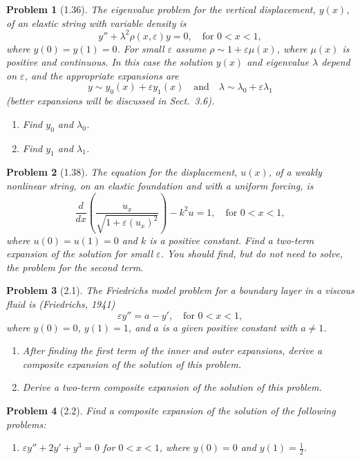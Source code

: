 \documentclass[11pt]{article}
\theoremstyle{problemstyle}
\newtheorem{problem}{Problem}
\begin{document}
\begin{problem}[1.36]
The eigenvalue problem for the vertical displacement, $y(x)$, of an elastic
string with variable density is
\[
y'' + \lambda^2 \rho(x, \varepsilon) y = 0, \quad \text{for } 0 < x < 1,
\]
where $y(0) = y(1) = 0$. For small $\varepsilon$ assume $\rho \sim 1 +
\varepsilon \mu(x)$, where $\mu(x)$ is positive and continuous. In this case the
solution $y(x)$ and eigenvalue $\lambda$ depend on $\varepsilon$, and the
appropriate expansions are
\[
  y \sim y_0(x) + \varepsilon y_1(x) \quad \text{and} \quad \lambda \sim
  \lambda_0 + \varepsilon \lambda_1
\]
(better expansions will be discussed in Sect.~3.6).
  \begin{enumerate}
      \item Find $y_0$ and $\lambda_0$.
      \item Find $y_1$ and $\lambda_1$.
  \end{enumerate}
\end{problem}

\begin{problem}[1.38]
The equation for the displacement, $u(x)$, of a weakly nonlinear string, on an
elastic foundation and with a uniform forcing, is
\[
  \frac{d}{dx} \left( \frac{u_x}{\sqrt{1 + \varepsilon (u_x)^2}} \right) - k^2 u
  = 1, \quad \text{for } 0 < x < 1,
\]
where $u(0) = u(1) = 0$ and $k$ is a positive constant. Find a two-term
expansion of the solution for small $\varepsilon$. You should find, but do not
need to solve, the problem for the second term.
\end{problem}

\begin{problem}[2.1]
The Friedrichs model problem for a boundary layer in a viscous fluid is 
(Friedrichs, 1941)
\[
\varepsilon y'' = a - y', \quad \text{for } 0 < x < 1,
\]
where $y(0) = 0$, $y(1) = 1$, and $a$ is a given positive constant with $a \ne 1$.
  \begin{enumerate}
      \item After finding the first term of the inner and outer expansions,
        derive a composite expansion of the solution of this problem.
      \item Derive a two-term composite expansion of the solution of this
        problem.
  \end{enumerate}
\end{problem}

\begin{problem}[2.2]
Find a composite expansion of the solution of the following problems:
  \begin{enumerate}
      \item $\varepsilon y'' + 2y' + y^3 = 0$ for $0 < x < 1$, where $y(0) = 0$
        and $y(1) = \tfrac{1}{2}$.
  \end{enumerate}
\end{problem}
\end{document}
